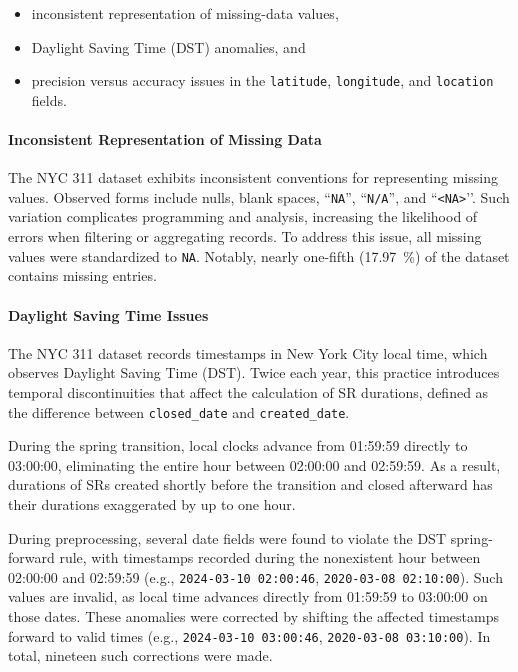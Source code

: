 \documentclass[linenumber]{jdsart}
\begin{document}
\begin{itemize}[left=1.5em]
  \item inconsistent representation of missing-data values,
  \item Daylight Saving Time (DST) anomalies, and
  \item precision versus accuracy issues in the \texttt{latitude},
  \texttt{longitude}, and \texttt{location} fields.
\end{itemize}

\paragraph{Inconsistent Representation of Missing Data}
\label{par:missingdata}
The NYC 311 dataset exhibits inconsistent conventions for representing
missing values. Observed forms include nulls, blank spaces, ``\texttt{NA}'',
``\texttt{N/A}'', and ``\texttt{<NA>}'’. Such variation complicates
programming and analysis, increasing the likelihood of errors when filtering
or aggregating records. To address this issue, all missing values were
standardized to \texttt{NA}. Notably, nearly one-fifth 
(\SI[round-precision = 2]{17.97}{\percent}) of the 
dataset contains missing entries.

\paragraph{Daylight Saving Time Issues}
\label{par:dst}
The NYC 311 dataset records timestamps in New York City local time, which
observes Daylight Saving Time (DST). Twice each year, this practice
introduces temporal discontinuities that affect the calculation of SR
durations, defined as the difference between \texttt{closed\_date} and
\texttt{created\_date}.

During the spring transition, local clocks advance from 01:59:59 directly to
03:00:00, eliminating the entire hour between 02:00:00 and 02:59:59. As a
result, durations of SRs created shortly before the transition and closed
 afterward has their durations exaggerated by up to one hour.

During preprocessing, several date fields were found to violate the DST
spring-forward rule, with timestamps recorded during the nonexistent hour
between 02:00:00 and 02:59:59
(e.g., \texttt{2024-03-10 02:00:46},
\texttt{2020-03-08 02:10:00}). Such values are invalid, as local time
advances directly from 01:59:59 to 03:00:00 on those dates. These anomalies
were corrected by shifting the affected timestamps forward to valid times
(e.g., \texttt{2024-03-10 03:00:46},
\texttt{2020-03-08 03:10:00}). In total, nineteen such corrections were made.
\end{document}
